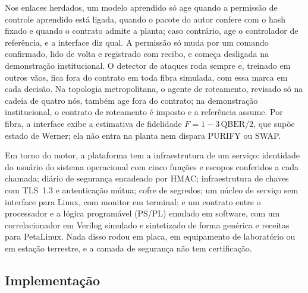 \documentclass[12pt]{article}
\begin{document}
Nos enlaces herdados, um modelo aprendido só age quando a permissão de controle
aprendido está ligada, quando o pacote do autor confere com o hash fixado e
quando o contrato admite a planta; caso contrário, age o controlador de
referência, e a interface diz qual. A permissão só muda por um comando
confirmado, lido de volta e registrado com recibo, e começa desligada na
demonstração institucional. O detector de ataques roda sempre e, treinado em
outros vãos, fica fora do contrato em toda fibra simulada, com essa marca em
cada decisão. Na topologia metropolitana, o agente de roteamento, revisado só na
cadeia de quatro nós, também age fora do contrato; na demonstração
institucional, o contrato de roteamento é imposto e a referência assume. Por
fibra, a interface exibe a estimativa de fidelidade $F=1-3\,\mathrm{QBER}/2$, que
supõe estado de Werner; ela não entra na planta nem dispara PURIFY ou SWAP.

Em torno do motor, a plataforma tem a infraestrutura de um serviço: identidade
do usuário do sistema operacional com cinco funções e escopos conferidos a cada
chamada; diário de segurança encadeado por HMAC; infraestrutura de chaves com
TLS~1.3 e autenticação mútua; cofre de segredos; um núcleo de serviço sem
interface para Linux, com monitor em terminal; e um contrato entre o processador
e a lógica programável (PS/PL) emulado em software, com um correlacionador em
Verilog simulado e sintetizado de forma genérica e receitas para PetaLinux. Nada
disso rodou em placa, em equipamento de laboratório ou em estação terrestre, e a
camada de segurança não tem certificação.

\subsection{Implementação}
\end{document}
